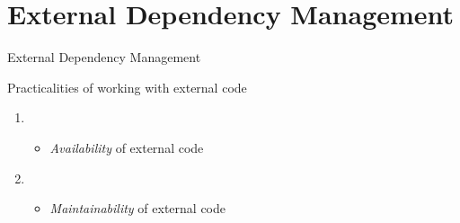 
\section{External Dependency Management}

\begin{frame}[c]{External Dependency Management}

    Practicalities of working with external code


    \begin{enumerate}
        \itemsep.3em

        \item {}
            \begin{itemize}
                \item \textit{Availability} of external code
            \end{itemize}

        \item {}
            \begin{itemize}
                \item \textit{Maintainability} of external code
            \end{itemize}

    \end{enumerate}

    \vfill

\end{frame}

